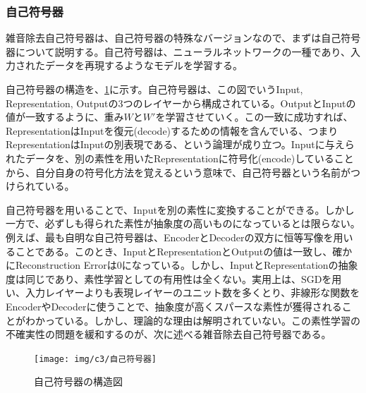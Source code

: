 \subsubsection{自己符号器}
雑音除去自己符号器は、自己符号器の特殊なバージョンなので、まずは自己符号器について説明する。自己符号器は、ニューラルネットワークの一種であり、入力されたデータを再現するようなモデルを学習する。\cite{bourlard1988auto, hinton1994自己符号器s, schwenk1995transformation}\par
自己符号器の構造を、\ref{c3_自己符号器}に示す。自己符号器は、この図でいうInput, Representation, Outputの3つのレイヤーから構成されている。OutputとInputの値が一致するように、重み$W$と$W'$を学習させていく。この一致に成功すれば、RepresentationはInputを復元(decode)するための情報を含んでいる、つまりRepresentationはInputの別表現である、という論理が成り立つ。Inputに与えられたデータを、別の素性を用いたRepresentationに符号化(encode)していることから、自分自身の符号化方法を覚えるという意味で、自己符号器という名前がつけられている。\par
自己符号器を用いることで、Inputを別の素性に変換することができる。しかし一方で、必ずしも得られた素性が抽象度の高いものになっているとは限らない。例えば、最も自明な自己符号器は、EncoderとDecoderの双方に恒等写像を用いることである。このとき、InputとRepresentationとOutputの値は一致し、確かにReconstruction Errorは0になっている。しかし、InputとRepresentationの抽象度は同じであり、素性学習としての有用性は全くない。実用上は、SGDを用い、入力レイヤーよりも表現レイヤーのユニット数を多くとり、非線形な関数をEncoderやDecoderに使うことで、抽象度が高くスパースな素性が獲得されることがわかっている\cite{bengio2007greedy}\cite{lee2007sparse}。しかし、理論的な理由は解明されていない。この素性学習の不確実性の問題を緩和するのが、次に述べる雑音除去自己符号器である。
\begin{figure}[tbp]
 \begin{center}
  \texttt{[image: img/c3/自己符号器]}
 \end{center}
 \caption{自己符号器の構造図}
 \label{c3_自己符号器}
\end{figure}

